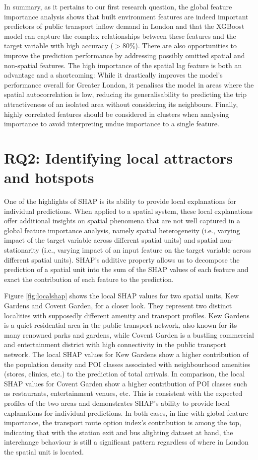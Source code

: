In summary, as it pertains to our first research question, the global feature importance analysis shows that built environment features are indeed important predictors of public transport inflow demand in London and that the XGBoost model can capture the complex relationships between these features and the target variable with high accuracy ($>80\%$). There are also opportunities to improve the prediction performance by addressing possibly omitted spatial and non-spatial features. The high importance of the spatial lag feature is both an advantage and a shortcoming: While it drastically improves the model's performance overall for Greater London, it penalises the model in areas where the spatial autocorrelation is low, reducing its generalisability to predicting the trip attractiveness of an isolated area without considering its neighbours. Finally, highly correlated features should be considered in clusters when analysing importance to avoid interpreting undue importance to a single feature.

\pagebreak[4]
\section{RQ2: Identifying local attractors and hotspots}

One of the highlights of SHAP is its ability to provide local explanations for individual predictions. When applied to a spatial system, these local explanations offer additional insights on spatial phenomena that are not well captured in a global feature importance analysis, namely spatial heterogeneity (i.e., varying impact of the target variable across different spatial units) and spatial non-stationarity (i.e., varying impact of an input feature on the target variable across different spatial units). SHAP's additive property allows us to decompose the prediction of a spatial unit into the sum of the SHAP values of each feature and exact the contribution of each feature to the prediction.

Figure \ref{fig:localshap} shows the local SHAP values for two spatial units, Kew Gardens and Covent Garden, for a closer look. They represent two distinct localities with supposedly different amenity and transport profiles. Kew Gardens is a quiet residential area in the public transport network, also known for its many renowned parks and gardens, while Covent Garden is a bustling commercial and entertainment district with high connectivity in the public transport network. The local SHAP values for Kew Gardens show a higher contribution of the population density and POI classes associated with neighbourhood amenities (stores, clinics, etc.) to the prediction of total arrivals. In comparison, the local SHAP values for Covent Garden show a higher contribution of POI classes such as restaurants, entertainment venues, etc. This is consistent with the expected profiles of the two areas and demonstrates SHAP's ability to provide local explanations for individual predictions. In both cases, in line with global feature importance, the transport route option index's contribution is among the top, indicating that with the station exit and bus alighting dataset at hand, the interchange behaviour is still a significant pattern regardless of where in London the spatial unit is located.

